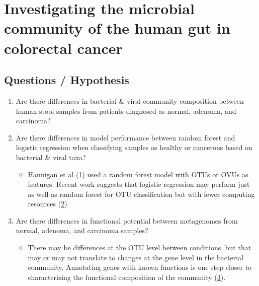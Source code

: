 \documentclass[11pt,]{article}
\author{}
\date{\vspace{-2.5em}}
\providecommand{\tightlist}{%
  \setlength{\itemsep}{0pt}\setlength{\parskip}{0pt}}
\begin{document}
\hypertarget{investigating-the-microbial-community-of-the-human-gut-in-colorectal-cancer}{%
\section{Investigating the microbial community of the human gut in
colorectal
cancer}\label{investigating-the-microbial-community-of-the-human-gut-in-colorectal-cancer}}

\hypertarget{questions-hypothesis}{%
\subsection{Questions / Hypothesis}\label{questions-hypothesis}}

\begin{enumerate}
\def\labelenumi{\arabic{enumi}.}
\tightlist
\item
  Are there differences in bacterial \& viral community composition
  between human stool samples from patients diagnosed as normal,
  adenoma, and carcinoma?
\item
  Are there differences in model performance between random forest and
  logistic regression when classifying samples as healthy or cancerous
  based on bacterial \& viral taxa?

  \begin{itemize}
  \tightlist
  \item
    Hannigan et al (\protect\hyperlink{ref-hannigan_diagnostic_2017}{1})
    used a random forest model with OTUs or OVUs as features. Recent
    work suggests that logistic regression may perform just as well as
    random forest for OTU classification but with fewer computing
    resources (\protect\hyperlink{ref-topcuoglu_effective_2019}{2}).
  \end{itemize}
\item
  Are there differences in functional potential between metagenomes from
  normal, adenoma, and carcinoma samples?

  \begin{itemize}
  \tightlist
  \item
    There may be differences at the OTU level between conditions, but
    that may or may not translate to changes at the gene level in the
    bacterial community. Annotating genes with known functions is one
    step closer to characterizing the functional composition of the
    community (\protect\hyperlink{ref-carr_comparative_2014}{3}).
  \end{itemize}
\end{enumerate}
\end{document}
